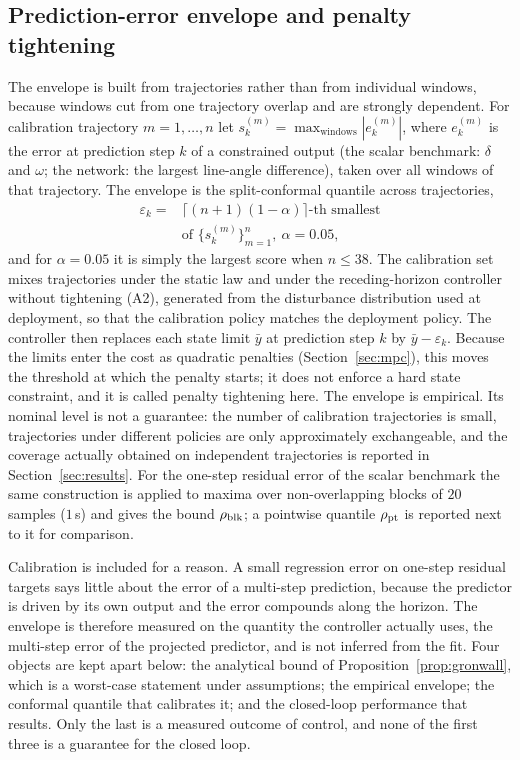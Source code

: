 \documentclass[preprint,12pt]{elsarticle}
\begin{document}
\subsection{Prediction-error envelope and penalty tightening}
\label{sec:tube}
The envelope is built from trajectories rather than from individual windows, because windows cut from one trajectory overlap and are strongly dependent. For calibration trajectory $m=1,\dots,n$ let $s_k^{(m)}=\max_{\text{windows}}|e_k^{(m)}|$, where $e_k^{(m)}$ is the error at prediction step $k$ of a constrained output (the scalar benchmark: $\delta$ and $\omega$; the network: the largest line-angle difference), taken over all windows of that trajectory. The envelope is the split-conformal quantile across trajectories,
\begin{equation}
\begin{split}\varepsilon_k ={}&\lceil (n+1)(1-\alpha)\rceil\text{-th smallest}\\ &\text{of } \{s_k^{(m)}\}_{m=1}^{n},\ \alpha=0.05,\end{split}
\label{eq:conf}
\end{equation}
and for $\alpha=0.05$ it is simply the largest score when $n\le38$. The calibration set mixes trajectories under the static law and under the receding-horizon controller without tightening (A2), generated from the disturbance distribution used at deployment, so that the calibration policy matches the deployment policy. The controller then replaces each state limit $\bar y$ at prediction step $k$ by $\bar y-\varepsilon_k$. Because the limits enter the cost as quadratic penalties (Section~\ref{sec:mpc}), this moves the threshold at which the penalty starts; it does not enforce a hard state constraint, and it is called penalty tightening here. The envelope is empirical. Its nominal level is not a guarantee: the number of calibration trajectories is small, trajectories under different policies are only approximately exchangeable, and the coverage actually obtained on independent trajectories is reported in Section~\ref{sec:results}. For the one-step residual error of the scalar benchmark the same construction is applied to maxima over non-overlapping blocks of $20$ samples ($1$\,s) and gives the bound $\rho_{\rm blk}$; a pointwise quantile $\rho_{\rm pt}$ is reported next to it for comparison.

Calibration is included for a reason. A small regression error on one-step residual targets says little about the error of a multi-step prediction, because the predictor is driven by its own output and the error compounds along the horizon. The envelope is therefore measured on the quantity the controller actually uses, the multi-step error of the projected predictor, and is not inferred from the fit. Four objects are kept apart below: the analytical bound of Proposition~\ref{prop:gronwall}, which is a worst-case statement under assumptions; the empirical envelope; the conformal quantile that calibrates it; and the closed-loop performance that results. Only the last is a measured outcome of control, and none of the first three is a guarantee for the closed loop.
\end{document}
